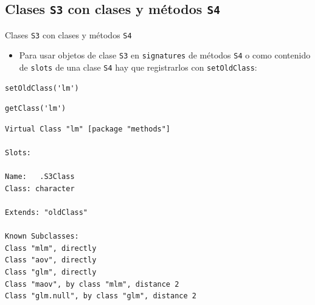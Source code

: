 \documentclass[xcolor={usenames,svgnames,dvipsnames}]{beamer}
\begin{document}
\subsection{Clases \texttt{S3} con clases y métodos \texttt{S4}}
\label{sec:orgheadline41}

\begin{frame}[fragile,label={sec:orgheadline37}]{Clases \texttt{S3} con clases y métodos \texttt{S4}}
 \begin{itemize}
\item Para usar objetos de clase \texttt{S3} en \texttt{signatures} de métodos \texttt{S4} o
como contenido de \texttt{slots} de una clase \texttt{S4} hay que registrarlos con
\texttt{setOldClass}:
\end{itemize}
\lstset{language=R,label= ,caption= ,captionpos=b,numbers=none}
\begin{lstlisting}
setOldClass('lm')
\end{lstlisting}

\lstset{language=R,label= ,caption= ,captionpos=b,numbers=none}
\begin{lstlisting}
getClass('lm')
\end{lstlisting}

\begin{verbatim}
Virtual Class "lm" [package "methods"]

Slots:
                
Name:   .S3Class
Class: character

Extends: "oldClass"

Known Subclasses: 
Class "mlm", directly
Class "aov", directly
Class "glm", directly
Class "maov", by class "mlm", distance 2
Class "glm.null", by class "glm", distance 2
\end{verbatim}
\end{frame}
\end{document}
